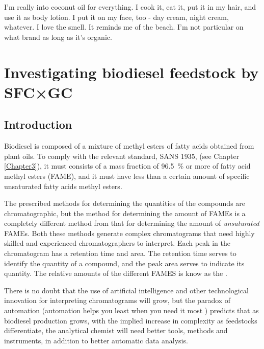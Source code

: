 
\begin{savequote}[45mm] I'm really into coconut oil for everything. I cook it,
eat it, put it in my hair, and use it as body lotion. I put it on my face, too -
day cream, night cream, whatever. I love the smell. It reminds me of the beach.
I'm not particular on what brand as long as it's organic.

\end{savequote}

\chapter{Investigating biodiesel feedstock by SFC×GC} %

\label{Chapter6} %

\section{Introduction}


Biodiesel is composed of a mixture of methyl esters of fatty acids obtained from
plant oils. To comply with the relevant standard, SANS 1935, \autocite{SANS1935}
(see Chapter \ref{Chapter3}), it must consists of a mass fraction of
\SI{96.5}{\percent} or more of fatty acid methyl esters (FAME), and it must have
less than a certain amount of specific unsaturated fatty acids methyl esters.

The prescribed methods for determining the quantities of the compounds are
chromatographic, but the method for  determining the amount of FAMEs is a
completely different method from that for determining the amount of
\textit{unsaturated} FAMEs. Both these methods generate complex chromatograms
that need highly skilled and experienced chromatographers to interpret. Each
peak in the chromatogram has a retention time and area. The retention time
serves to identify the quantity of a compound, and the peak area serves to
indicate its quantity. The relative amounts of the different FAMES is know as
the .

There is no doubt that the use of artificial intelligence and other
technological innovation for interpreting chromatograms will grow, but the
paradox of automation (automation helps you least when you need it most
\autocite{Strauch2018, Bainbridge1983}) predicts that as biodiesel production
grows, with the implied increase in complexity as feedstocks differentiate, the
analytical chemist will need better tools, methods and instruments, in addition
to better automatic data analysis.

